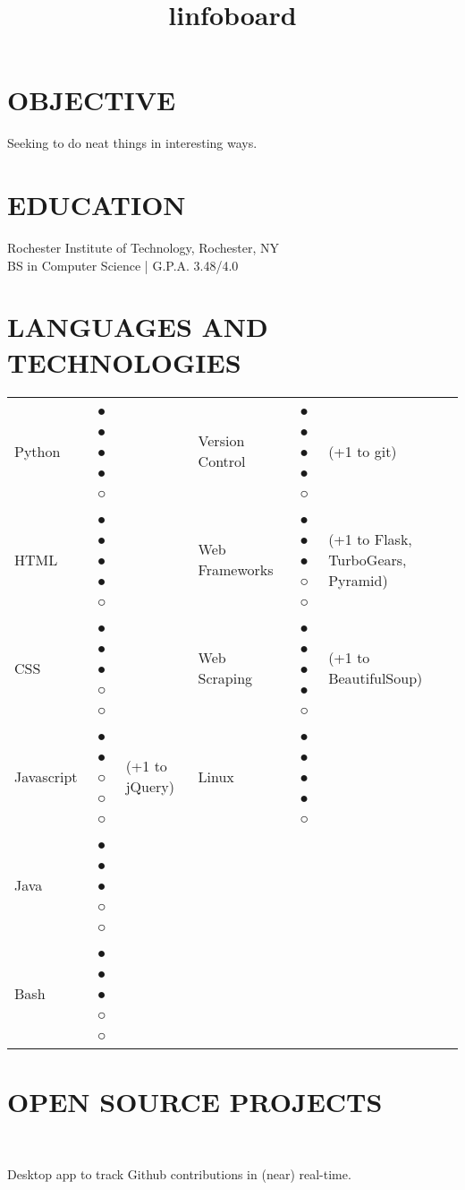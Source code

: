 \documentclass[line]{res}
\begin{document}

\address{131 Countess Drive\\West Henrietta, NY 14586}

\begin{resume}

\section{OBJECTIVE}
    Seeking to do neat things in interesting ways.

\section{EDUCATION}
    Rochester Institute of Technology, Rochester, NY \\
    BS in Computer Science | G.P.A. 3.48/4.0

\section{LANGUAGES AND TECHNOLOGIES}
    \begin{tabular}{l c l l c l}
        Python & ● ● ● ● ○ && Version Control & ● ● ● ● ○ & (+1 to git)\\
        HTML & ● ● ● ● ○ && Web Frameworks & ● ● ● ○ ○ & (+1 to Flask, TurboGears, Pyramid)\\
        CSS & ● ● ● ○ ○ && Web Scraping & ● ● ● ● ○ & (+1 to BeautifulSoup)\\
        Javascript & ● ● ○ ○ ○ & (+1 to jQuery) & Linux & ● ● ● ● ○\\
        Java & ● ● ● ○ ○\\
        Bash & ● ● ● ○ ○\\

    \end{tabular}

\section{OPEN SOURCE PROJECTS}
    \begin{format}
        \title{l}\\
        \body
    \end{format}

    \title{infoboard}
    \begin{position}
        Desktop app to track Github contributions in (near) real-time.
    \end{position}


\end{resume}
\end{document}
